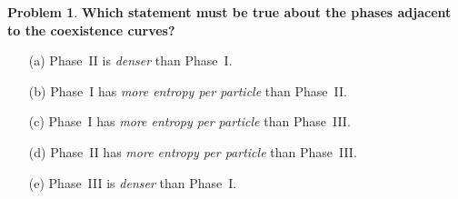 \documentclass[10pt]{article}
\theoremstyle{definition} %
\newtheorem{problem}{Problem}
\theoremstyle{plain} %
\begin{document}
\begin{problem}
                                          \medskip
                                          \textbf{Which statement must be true about the phases adjacent to the
                                          coexistence curves?}
                                          
                                          \begin{enumerate}
                                            \item[(a)] Phase~II is \emph{denser} than Phase~I.
                                            \item[(b)] Phase~I has \emph{more entropy per particle} than Phase~II.
                                            \item[(c)] Phase~I has \emph{more entropy per particle} than Phase~III.
                                            \item[(d)] Phase~II has \emph{more entropy per particle} than Phase~III.
                                            \item[(e)] Phase~III is \emph{denser} than Phase~I.
                                          \end{enumerate}
                                          \end{problem}
\end{document}
